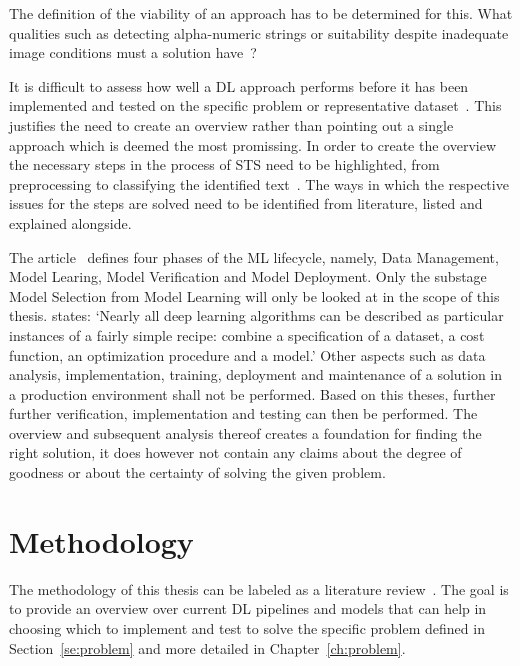 The definition of the viability of an approach has to be determined for this.
What qualities such as detecting alpha-numeric strings or suitability despite
inadequate image conditions must a solution have~\citep{ghosh_visual_2017, hu_gtc_2020}?

It is difficult to assess how well a \ac{DL} approach performs before it has been
implemented and tested on the specific problem or representative dataset~\citep{arpteg_software_2018}.
This justifies the need to create an overview rather than pointing out a single approach which is
deemed the most promissing.
In order to create the overview the necessary steps in the process of \ac{STS} need to be highlighted,
from preprocessing to classifying the identified text~\citep{long_scene_2021, sourvanos_challenges_2018}.
The ways in which the respective issues for the steps are solved need to be
identified from literature, listed and explained alongside.

The article~\cite{ashmore_assuring_2021} defines four phases of the \ac{ML} lifecycle, namely,
Data Management, Model Learing, Model Verification and Model Deployment.
Only the substage Model Selection from Model Learning will only be looked at in the scope of this
thesis.
\cite{goodfellow_deep_2016} states:
`Nearly all deep learning algorithms can be described as particular instances of a fairly simple
recipe: combine a specification of a dataset, a cost function, an optimization procedure and a model.'
Other aspects such as data analysis, implementation, training, deployment and maintenance of a
solution in a production environment shall not be performed.
Based on this theses, further further verification, implementation and testing can then be performed.
The overview and subsequent analysis thereof creates a foundation for finding the right solution,
it does however not contain any claims about the degree of goodness or about the certainty of
solving the given problem.

\section{Methodology}\label{se:methodology}
The methodology of this thesis can be labeled as a literature review~\citep{snyder_literature_2019,
torraco_writing_2005}.
The goal is to provide an overview over current \ac{DL} pipelines and models that can help in
choosing which to implement and test to solve the specific problem defined in
Section~\ref{se:problem} and more detailed in Chapter~\ref{ch:problem}.

